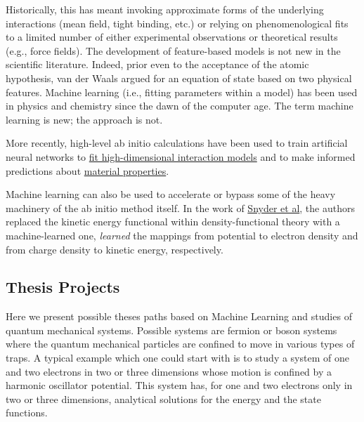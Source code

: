 \documentclass[%
oneside,                 %
final,                   %
10pt]{article}
\begin{document}
Historically, this has meant invoking
approximate forms of the underlying interactions (mean field, tight
binding, etc.) or relying on phenomenological fits to a limited number
of either experimental observations or theoretical results (e.g., force fields). 
The development of feature-based models is not
new in the scientific literature. Indeed, prior even to the acceptance
of the atomic hypothesis, van der Waals argued for an equation of
state based on two physical features. Machine learning (i.e.,
fitting parameters within a model) has been used in physics and
chemistry since the dawn of the computer age. The term machine
learning is new; the approach is not.

More recently, high-level ab initio calculations have been used to
train artificial neural networks to \href{{http://www.sciencedirect.com/science/article/pii/S0927025615007806?via%
models}  and to make informed predictions about \href{{https://www.nature.com/articles/srep40827}}{material properties}. 

Machine learning can also be used to accelerate or bypass some of the
heavy machinery of the ab initio method itself. In the work of \href{{https://journals.aps.org/prl/abstract/10.1103/PhysRevLett.108.253002}}{Snyder et al},  the authors
replaced the kinetic energy functional within density-functional
theory with a machine-learned one, 
\emph{learned} the mappings from potential to electron density and from
charge density to kinetic energy, respectively.

\subsection{Thesis Projects}

Here we present possible theses paths based on Machine Learning and
studies of quantum mechanical systems.  Possible systems are fermion
or boson systems where the quantum mechanical particles are confined
to move in various types of traps. A typical example which one could
start with is to study a system of one and two electrons in two or three
dimensions whose motion is confined by a harmonic  oscillator potential. This
system has, for one and two electrons only in two or three dimensions,
analytical solutions for the energy and the state
functions. 
\end{document}
